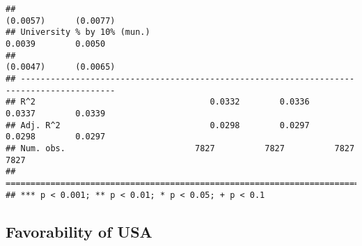 \documentclass[
]{article}
\begin{document}
\begin{verbatim}
##                                                                  (0.0057)      (0.0077)  
## University % by 10% (mun.)                                        0.0039        0.0050   
##                                                                  (0.0047)      (0.0065)  
## -----------------------------------------------------------------------------------------
## R^2                                   0.0332        0.0336        0.0337        0.0339   
## Adj. R^2                              0.0298        0.0297        0.0298        0.0297   
## Num. obs.                          7827          7827          7827          7827        
## =========================================================================================
## *** p < 0.001; ** p < 0.01; * p < 0.05; + p < 0.1
\end{verbatim}

\hypertarget{favorability-of-usa}{%
\subsection{Favorability of USA}\label{favorability-of-usa}}
\end{document}
